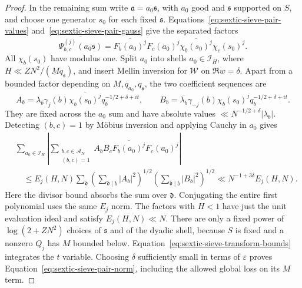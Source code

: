 \documentclass[11pt,a4paper]{article}
\numberwithin{equation}{section}
\numberwithin{figure}{section}
\theoremstyle{definition}
\theoremstyle{remark}
\begin{document}
\begin{proof}
In the remaining sum write $\mathfrak a=a_0\mathfrak s$, with $a_0$ good
and $\mathfrak s$ supported on $S$, and choose one generator $s_0$ for
each fixed $\mathfrak s$.  Equations~\eqref{eq:sextic-sieve-pair-values}
and~\eqref{eq:sextic-sieve-pair-gauss} give the separated factors
\[
 \overline{\Psi_{b,c}^{(j)}(a_0\mathfrak s)}
 =\overline{F_b(a_0)^j}F_c(a_0)^j
       \overline{\chi_b(s_0)^j}\chi_c(s_0)^j.
\]
All $\chi_b(s_0)$ have modulus one.  Split $a_0$ into shells
$a_0\in\mathcal I_H$, where $H\ll ZN^2/(Mq_{\mathfrak s})$, and insert
Mellin inversion for $\mathscr W$ on $\Re w=\delta$.  Apart from a
bounded factor depending on $M,q_{a_0},q_{\mathfrak s}$, the two
coefficient sequences are
\[
 A_b=\lambda_b\gamma_j(b)\overline{\chi_b(s_0)^j}
                    q_b^{-1/2+\delta+it},\qquad
 B_b=\overline{\lambda_b}\gamma_{-j}(b)\chi_b(s_0)^j
                    q_b^{-1/2+\delta+it}.
\]
They are fixed across the $a_0$ sum and have absolute values
$\ll N^{-1/2+\delta}|\lambda_b|$.  Detecting $(b,c)=1$ by M\"obius inversion
and applying Cauchy in $a_0$ gives
\begin{align*}
 &\sum_{a_0\in\mathcal I_H}
  \left|\sum_{\substack{b,c\in\mathcal A_N\\(b,c)=1}}
       A_bB_c\overline{F_b(a_0)^j}F_c(a_0)^j\right|\\
 &\quad\le E_j(H,N)\sum_{\mathfrak d}
   \left(\sum_{\mathfrak d\mid b}|A_b|^2\right)^{1/2}
   \left(\sum_{\mathfrak d\mid b}|B_b|^2\right)^{1/2}
 \ll N^{-1+3\delta}E_j(H,N).
\end{align*}
Here the divisor bound absorbs the sum over $\mathfrak d$.  Conjugating
the entire first polynomial uses the same $E_j$ norm.  The factors with
$H<1$ have just the unit evaluation ideal and satisfy $E_j(H,N)\ll N$.
There are only a fixed power of $\log(2+ZN^2)$ choices of
$\mathfrak s$ and of the dyadic shell, because $S$ is fixed and a nonzero
$Q_j$ has $M$ bounded below.  Equation~\eqref{eq:sextic-sieve-transform-bounds}
integrates the $t$ variable.  Choosing $\delta$ sufficiently small in
terms of $\varepsilon$ proves Equation~\eqref{eq:sextic-sieve-pair-norm},
including the allowed global loss on its $M$ term.


\end{proof}
\end{document}
